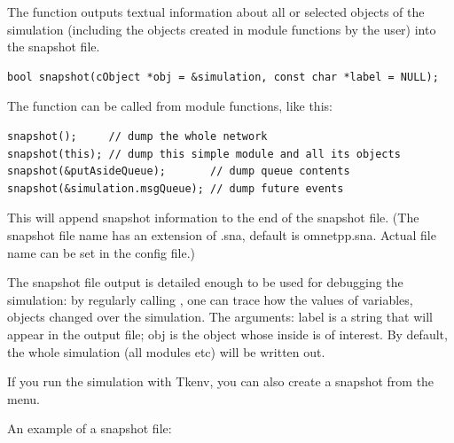 The  function outputs textual information about all
or selected objects of the simulation (including the objects created
in module functions by the user) into the snapshot file.

\begin{verbatim}
bool snapshot(cObject *obj = &simulation, const char *label = NULL);
\end{verbatim}


The function can be called from module functions, like this:

\begin{verbatim}
snapshot();     // dump the whole network
snapshot(this); // dump this simple module and all its objects
snapshot(&putAsideQueue);       // dump queue contents
snapshot(&simulation.msgQueue); // dump future events
\end{verbatim}

This will append snapshot information to the end of the snapshot file.
(The snapshot file name has an extension of .sna, default is
omnetpp.sna. Actual file name can be set in the
config file.)


The snapshot file output is detailed enough to be used for debugging
the simulation: by regularly calling , one can trace
how the values of variables, objects changed over the simulation.
The arguments: label is a string that will appear in the output
file; obj is the object whose inside is of interest. By default,
the whole simulation (all modules etc) will be written out.

If you run the simulation with Tkenv, you can also create a snapshot
from the menu.


An example of a snapshot file:

